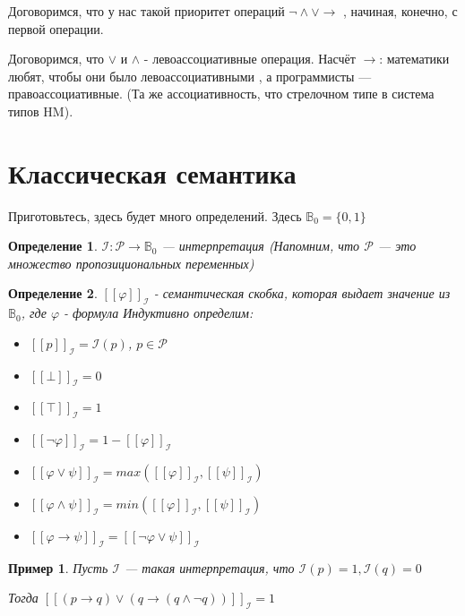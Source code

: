 \documentclass[12pt]{article}
\newtheorem{definition}{Определение}
\newtheorem{example}{Пример}
\begin{document}
Договоримся, что у нас такой приоритет операций
$\lnot\land\lor\to$
, начиная, конечно, с первой операции.

Договоримся, что $\lor$ и $\land$ - левоассоциативные операция.
Насчёт $\to$: математики любят, чтобы они было левоассоциативными
, а программисты --- правоассоциативные. (Та же ассоциативность, что стрелочном типе в система типов HM).



\section{Классическая семантика}
Приготовьтесь, здесь будет много определений.
Здесь $\mathbb{B}_0 = \{0, 1\}$

\begin{definition}
	$\mathcal{I}: \mathcal{P} \rightarrow \mathbb{B}_0$ --- интерпретация (Напомним, что $\mathcal{P}$ --- это множество пропозициональных переменных)
\end{definition}

\begin{definition}
	$[\![ \varphi ]\!]_{\mathcal{I}}$ - семантическая скобка, которая выдает значение из $\mathbb{B}_0$, где $\varphi$ - формула
	Индуктивно определим:
	\begin{itemize}
		\item $[\![ p ]\!]_{\mathcal{I}} = \mathcal{I}(p)$, $p \in \mathcal{P}$
		\item $[\![ \bot ]\!]_{\mathcal{I}} = 0$
		\item $[\![ \top ]\!]_{\mathcal{I}} = 1$
		\item $[\![ \lnot \varphi ]\!]_{\mathcal{I}} = 1 - [\![ \varphi ]\!]_{\mathcal{I}}$
		\item $[\![ \varphi \lor \psi ]\!]_{\mathcal{I}} = max([\![ \varphi ]\!]_{\mathcal{I}}, [\![ \psi ]\!]_{\mathcal{I}})$
		\item $[\![ \varphi \land \psi ]\!]_{\mathcal{I}} = min([\![ \varphi ]\!]_{\mathcal{I}}, [\![ \psi ]\!]_{\mathcal{I}})$
		\item $[\![ \varphi \to \psi ]\!]_{\mathcal{I}} = [\![ \lnot \varphi \lor \psi ]\!]_{\mathcal{I}}$
	\end{itemize}
\end{definition}

\begin{example}
	Пусть $\mathcal{I}$ --- такая интерпретация, что $\mathcal{I}(p) = 1, \mathcal{I}(q) = 0$

	Тогда $[\![ (p \to q) \lor (q \to (q \land \lnot q)) ]\!]_{\mathcal{I}} = 1$
\end{example}
\end{document}
